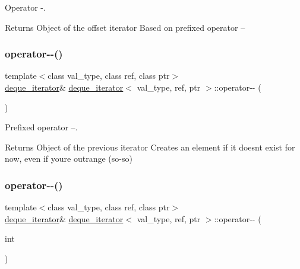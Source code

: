 Operator -\/. 

\begin{DoxyReturn}{Returns}
Object of the offset iterator Based on prefixed operator -- 
\end{DoxyReturn}
\hypertarget{structdeque__iterator_a9f8508814096bc20b9f00c90335f8235}{}\label{structdeque__iterator_a9f8508814096bc20b9f00c90335f8235} 
\subsubsection{\texorpdfstring{operator-\/-\/()}{operator--()}\hspace{0.1cm}{\footnotesize\ttfamily [1/2]}}
{\footnotesize\ttfamily template$<$class val\+\_\+type, class ref, class ptr$>$ \\
\hyperlink{structdeque__iterator}{deque\+\_\+iterator}\& \hyperlink{structdeque__iterator}{deque\+\_\+iterator}$<$ val\+\_\+type, ref, ptr $>$\+::operator-\/-\/ (\begin{DoxyParamCaption}{ }\end{DoxyParamCaption})\hspace{0.3cm}{\ttfamily [inline]}}



Prefixed operator --. 

\begin{DoxyReturn}{Returns}
Object of the previous iterator Creates an element if it doesn\textquotesingle{}t exist for now, even if you\textquotesingle{}re outrange (so-\/so) 
\end{DoxyReturn}
\hypertarget{structdeque__iterator_ae9ba6713301a848f537cf476ecb2aacc}{}\label{structdeque__iterator_ae9ba6713301a848f537cf476ecb2aacc} 
\subsubsection{\texorpdfstring{operator-\/-\/()}{operator--()}\hspace{0.1cm}{\footnotesize\ttfamily [2/2]}}
{\footnotesize\ttfamily template$<$class val\+\_\+type, class ref, class ptr$>$ \\
\hyperlink{structdeque__iterator}{deque\+\_\+iterator}\& \hyperlink{structdeque__iterator}{deque\+\_\+iterator}$<$ val\+\_\+type, ref, ptr $>$\+::operator-\/-\/ (\begin{DoxyParamCaption}\item[{int}]{ }\end{DoxyParamCaption})\hspace{0.3cm}{\ttfamily [inline]}}




